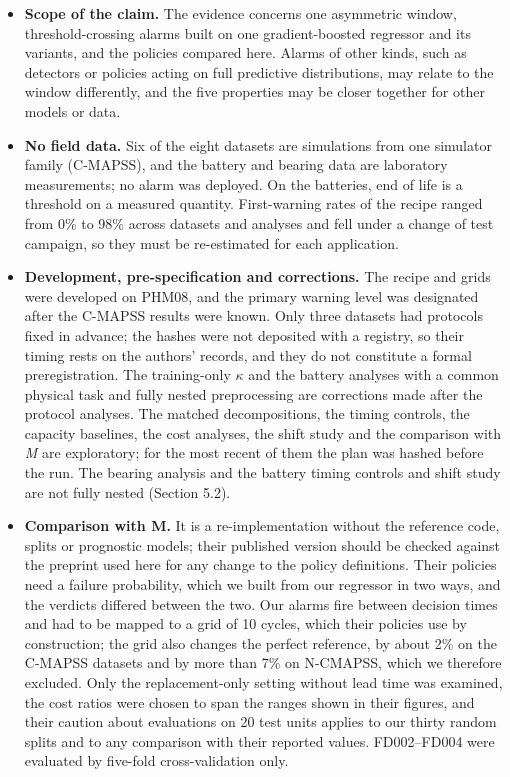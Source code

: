 \documentclass[a4paper,fleqn,doubleblind]{cas-dc}
\begin{document}
\begin{itemize}[leftmargin=1.2em,itemsep=2pt]
\item \textbf{Scope of the claim.} The evidence concerns one asymmetric window, threshold-crossing alarms built on one gradient-boosted regressor and its variants, and the policies compared here. Alarms of other kinds, such as detectors or policies acting on full predictive distributions, may relate to the window differently, and the five properties may be closer together for other models or data.
\item \textbf{No field data.} Six of the eight datasets are simulations from one simulator family (C-MAPSS), and the battery and bearing data are laboratory measurements; no alarm was deployed. On the batteries, end of life is a threshold on a measured quantity. First-warning rates of the recipe ranged from 0\% to 98\% across datasets and analyses and fell under a change of test campaign, so they must be re-estimated for each application.
\item \textbf{Development, pre-specification and corrections.} The recipe and grids were developed on PHM08, and the primary warning level was designated after the C-MAPSS results were known. Only three datasets had protocols fixed in advance; the hashes were not deposited with a registry, so their timing rests on the authors' records, and they do not constitute a formal preregistration. The training-only $\kappa$ and the battery analyses with a common physical task and fully nested preprocessing are corrections made after the protocol analyses. The matched decompositions, the timing controls, the capacity baselines, the cost analyses, the shift study and the comparison with \textit{M} are exploratory; for the most recent of them the plan was hashed before the run. The bearing analysis and the battery timing controls and shift study are not fully nested (Section 5.2).
\item \textbf{Comparison with M.} It is a re-implementation without the reference code, splits or prognostic models; their published version should be checked against the preprint used here for any change to the policy definitions. Their policies need a failure probability, which we built from our regressor in two ways, and the verdicts differed between the two. Our alarms fire between decision times and had to be mapped to a grid of 10 cycles, which their policies use by construction; the grid also changes the perfect reference, by about 2\% on the C-MAPSS datasets and by more than 7\% on N-CMAPSS, which we therefore excluded. Only the replacement-only setting without lead time was examined, the cost ratios were chosen to span the ranges shown in their figures, and their caution about evaluations on 20 test units applies to our thirty random splits and to any comparison with their reported values. FD002--FD004 were evaluated by five-fold cross-validation only.

\end{itemize}
\end{document}
